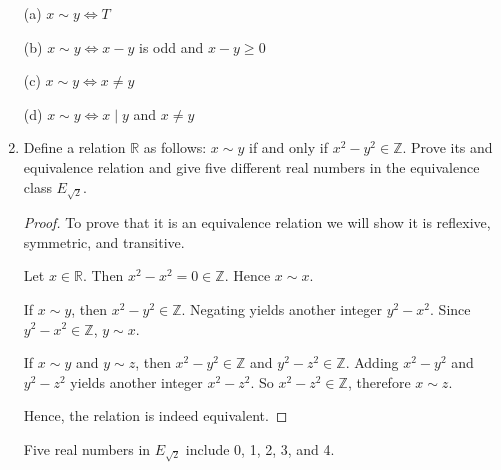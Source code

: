 \documentclass[12pt]{article}
\begin{document}
\begin{enumerate}
		\noindent (a) $x\sim y\iff T$
		
		\noindent (b) $x\sim y\iff x-y$ is odd and $x-y\geq 0$
		
		\noindent (c) $x\sim y\iff x\neq y$
		
		\noindent (d) $x\sim y\iff x\mid y$ and $x\neq y$
		
		\newpage
		
		\item Define a relation $\mathbb{R}$ as follows: $x\sim y$ if and only if $x^2-y^2\in \mathbb{Z}$. Prove its and equivalence relation and give five different real numbers in the equivalence class $E_{\sqrt{2}}$.
		
		\begin{proof}
			To prove that it is an equivalence relation we will show it is reflexive, symmetric, and transitive.
			
			Let $x\in \mathbb{R}$. Then $x^2-x^2=0\in \mathbb{Z}$. Hence $x\sim x$.
			
			If $x\sim y$, then $x^2-y^2\in \mathbb{Z}$. Negating yields another integer $y^2-x^2$. Since $y^2-x^2\in \mathbb{Z}$, $y\sim x$.
			
			If $x\sim y$ and $y\sim z$, then $x^2-y^2\in\mathbb{Z}$ and $y^2-z^2\in\mathbb{Z}$. Adding $x^2-y^2$ and $y^2-z^2$ yields another integer $x^2-z^2$. So $x^2-z^2\in\mathbb{Z}$, therefore $x\sim z$.
			
			Hence, the relation is indeed equivalent.
		\end{proof}
	
		Five real numbers in $E_{\sqrt{2}}$ include 0, 1, 2, 3, and 4.
	
	\end{enumerate}
\end{document}
